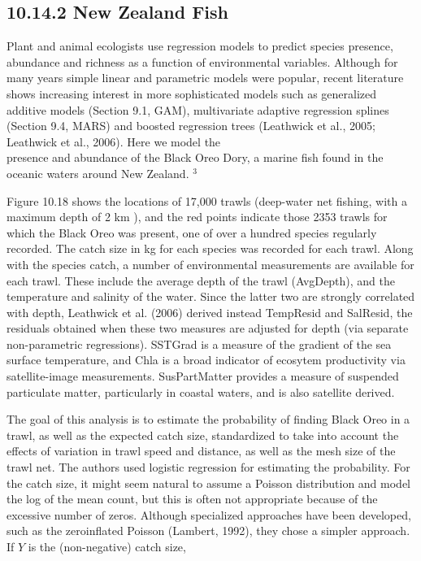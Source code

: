 \documentclass[10pt]{article}
\begin{document}
\subsection*{10.14.2 New Zealand Fish}
Plant and animal ecologists use regression models to predict species presence, abundance and richness as a function of environmental variables. Although for many years simple linear and parametric models were popular, recent literature shows increasing interest in more sophisticated models such as generalized additive models (Section 9.1, GAM), multivariate adaptive regression splines (Section 9.4, MARS) and boosted regression trees (Leathwick et al., 2005; Leathwick et al., 2006). Here we model the\\
presence and abundance of the Black Oreo Dory, a marine fish found in the oceanic waters around New Zealand. ${ }^{3}$

Figure 10.18 shows the locations of 17,000 trawls (deep-water net fishing, with a maximum depth of 2 km ), and the red points indicate those 2353 trawls for which the Black Oreo was present, one of over a hundred species regularly recorded. The catch size in kg for each species was recorded for each trawl. Along with the species catch, a number of environmental measurements are available for each trawl. These include the average depth of the trawl (AvgDepth), and the temperature and salinity of the water. Since the latter two are strongly correlated with depth, Leathwick et al. (2006) derived instead TempResid and SalResid, the residuals obtained when these two measures are adjusted for depth (via separate non-parametric regressions). SSTGrad is a measure of the gradient of the sea surface temperature, and Chla is a broad indicator of ecosytem productivity via satellite-image measurements. SusPartMatter provides a measure of suspended particulate matter, particularly in coastal waters, and is also satellite derived.

The goal of this analysis is to estimate the probability of finding Black Oreo in a trawl, as well as the expected catch size, standardized to take into account the effects of variation in trawl speed and distance, as well as the mesh size of the trawl net. The authors used logistic regression for estimating the probability. For the catch size, it might seem natural to assume a Poisson distribution and model the log of the mean count, but this is often not appropriate because of the excessive number of zeros. Although specialized approaches have been developed, such as the zeroinflated Poisson (Lambert, 1992), they chose a simpler approach. If $Y$ is the (non-negative) catch size,
\end{document}
